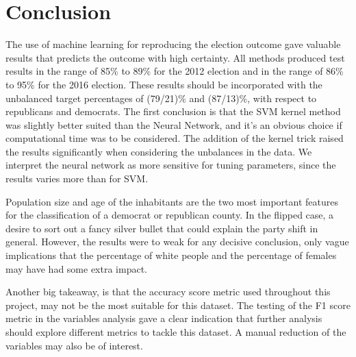 \section{Conclusion}
\setlength{\parindent}{0cm}
The use of machine learning for reproducing the election outcome gave valuable results that predicts the outcome with high certainty. All methods produced test results in the range of 85\% to 89\% for the 2012 election and in the range of 86\% to 95\% for the 2016 election. These results should be incorporated with the unbalanced target percentages of (79/21)\% and (87/13)\%, with respect to republicans and democrats. The first conclusion is that the SVM kernel method was slightly better suited than the Neural Network, and it's an obvious choice if computational time was to be considered. The addition of the kernel trick raised the results significantly when considering the unbalances in the data. We interpret the neural network as more sensitive for tuning parameters, since the results varies more than for SVM.  
\\
\par
Population size and age of the inhabitants are the two most important features for the classification of a democrat or republican county. In the flipped case, a desire to sort out a fancy silver bullet that could explain the party shift in general. However, the results were to weak for any decisive conclusion, only vague implications that the percentage of white people and the percentage of females may have had some extra impact.
\\
\par
Another big takeaway, is that the accuracy score metric used throughout this project, may not be the most suitable for this dataset. The testing of the F1 score metric in the variables analysis gave a clear indication that further analysis should explore different metrics to tackle this dataset. A manual reduction of the variables may also be of interest.